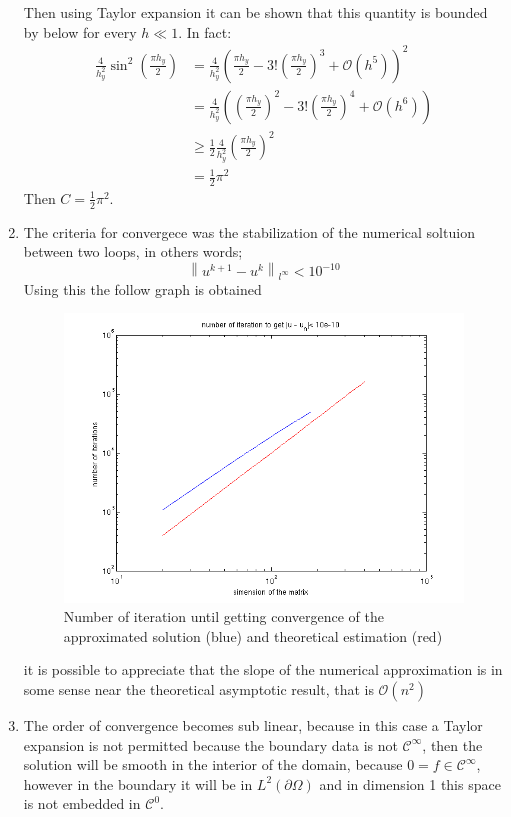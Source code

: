 \documentclass{article}
\numberwithin{equation}{section}
\begin{document}
\begin{enumerate}[label=(\alph*)]
        Then using Taylor expansion it can be shown that this quantity is bounded by below for every $h \ll 1$. In fact:
        \begin{align*}
            \frac{4}{h_y^2} \sin^2{(\frac{\pi h_y}{2})}
            & = \frac{4}{h_y^2}\left(\frac{\pi h_y}{2}-3!\left(\frac{\pi h_y}{2}\right)^3 + \mathcal{O}(h^5)\right)^2\\
            & = \frac{4}{h_y^2}\left(\left(\frac{\pi h_y}{2}\right)^2 - 3!\left(\frac{\pi h_y}{2}\right)^4 + \mathcal{O}(h^6)\right)\\
            & \geqslant \frac{1}{2}\frac{4}{h_y^2}\left(\frac{\pi h_y}{2}\right)^2\\
            & = \frac{1}{2}\pi^2
        \end{align*}
        Then $C = \frac{1}{2}\pi^2$.
        \item The criteria for convergece was the stabilization of the numerical soltuion between two loops, in others words;
            $$\left\lVert u^{k+1} - u^k\right\rVert_{l^\infty} < 10^{-10}$$
        Using this the follow graph is obtained
        \begin{figure}[!htbp]
            \centering
            \includegraphics[width=15cm]{./p-set1/inform-3.png}
            \caption{Number of iteration until getting convergence of the approximated solution (blue) and theoretical estimation (red)}
        \end{figure}

        it is possible to appreciate that the slope of the numerical approximation is in some sense near the theoretical asymptotic result, that is $\mathcal{O}(n^2)$
        \item The order of convergence becomes sub linear, because in this case a Taylor expansion is not permitted because the boundary data is not $\mathcal{C}^{\infty}$, then the solution
        will be smooth in the interior of the domain, because  $0 = f \in \mathcal{C}^{\infty}$, however in the boundary it will be in $L^2(\partial\Omega)$ and in dimension 1 this space is not embedded in $\mathcal{C}^0$.


\end{enumerate}
\end{document}
